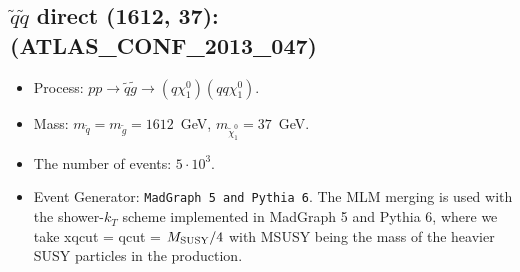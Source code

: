 \documentclass[12pt]{article}
\begin{document}
    
\subsection*{$\tilde q \tilde q$ direct (1612, 37): (ATLAS\_CONF\_2013\_047)} 


        \begin{itemize}
        \item  Process: $pp \to \tilde q \tilde g \to (q \chi_1^0)(q q \chi_1^0)$.
        \item  Mass: $m_{\tilde q} = m_{\tilde g} = 1612$~GeV, $m_{\tilde \chi_1^0} = 37$~GeV.
        \item  The number of events: $5 \cdot 10^3$.
        \item  Event Generator: {\tt MadGraph 5 and Pythia 6}.
                The MLM merging is used with the shower-$k_T$ scheme implemented in MadGraph 5 and Pythia 6, where we take xqcut = qcut = $M_{\rm SUSY}/4$ with MSUSY being the mass of the heavier SUSY particles in the production.      
        \end{itemize}    
    
\end{document}
